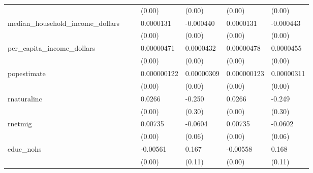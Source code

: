 {\begin{longtable}{|l|ll|ll|ll|}
                        &                     &                     &      (0.00)         &      (0.00)         &      (0.00)         &      (0.00)         \\
            [1em]
            median\_household\_income\_dollars&                     &                     &   0.0000131\sym{***}&   -0.000440\sym{***}&   0.0000131\sym{***}&   -0.000443\sym{***}\\
                        &                     &                     &      (0.00)         &      (0.00)         &      (0.00)         &      (0.00)         \\
            [1em]
            per\_capita\_income\_dollars&                     &                     &  0.00000471         &   0.0000432         &  0.00000478         &   0.0000455         \\
                        &                     &                     &      (0.00)         &      (0.00)         &      (0.00)         &      (0.00)         \\
            [1em]
            popestimate &                     &                     & 0.000000122\sym{***}&  0.00000309         & 0.000000123\sym{***}&  0.00000311         \\
                        &                     &                     &      (0.00)         &      (0.00)         &      (0.00)         &      (0.00)         \\
            [1em]
            rnaturalinc &                     &                     &      0.0266\sym{***}&      -0.250         &      0.0266\sym{***}&      -0.249         \\
                        &                     &                     &      (0.00)         &      (0.30)         &      (0.00)         &      (0.30)         \\
            [1em]
            rnetmig     &                     &                     &     0.00735\sym{***}&     -0.0604         &     0.00735\sym{***}&     -0.0602         \\
                        &                     &                     &      (0.00)         &      (0.06)         &      (0.00)         &      (0.06)         \\
            [1em]
            educ\_nohs   &                     &                     &    -0.00561\sym{***}&       0.167         &    -0.00558\sym{***}&       0.168         \\
                        &                     &                     &      (0.00)         &      (0.11)         &      (0.00)         &      (0.11)         \\

\end{longtable}}
